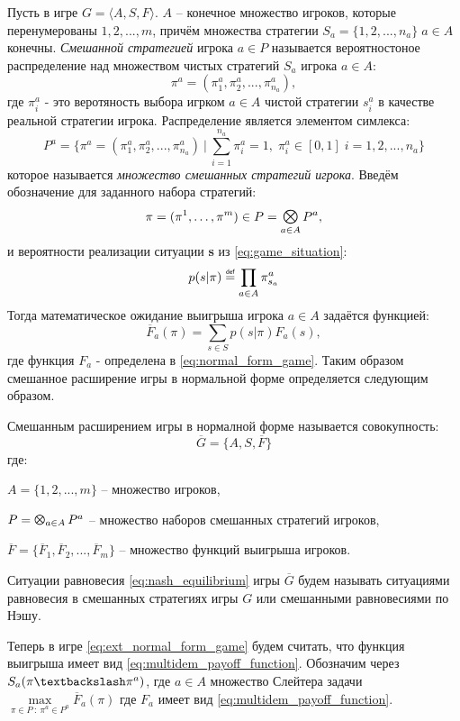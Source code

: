 Пусть в игре 
$G = \big \langle A, S, F \big \rangle$. $A$ -- конечное множество игроков,
которые перенумерованы $1, 2, ..., m$, причём
множества стратегии $S_a=\{1, 2,...,n_a\} \; a \in A$ конечны.  
\textit{Смешанной стратегией} игрока $a \in P$ называется 
вероятностоное распределение над множеством чистых стратегий 
$S_a$ игрока $a \in A$:
$$
	\pi^a=(\pi^a_1, \pi^a_2, ..., \pi^a_{n_a}),
$$
где $\pi^a_i$ - это веротяность выбора игрком $a \in A$ чистой 
стратегии $s^a_i$ в качестве реальной стратегии игрока.
Распределение является элементом симлекса:
$$
	P^a = \{ 
		\pi^a=(\pi^a_1, \pi^a_2, ..., \pi^a_{n_a}) \: | \:
		\sum \limits_{i=1}^{n_a} \pi^a_i = 1, \; \pi^a_i \in [0,1] \; 
		i = 1, 2, ..., n_a
		\}
$$
которое называется \textit{множество смешанных стратегий игрока}.
Введём обозначение для заданного набора стратегий:
$$
	\pi = (\pi^1, \ldots, \pi^m) \in P = \Motimes_{a \in A} P^a,
$$
и вероятности реализации ситуации \textbf{s} из 
\eqref{eq:game_situation}:
$$
	p(s|\pi) \myeq \prod_{a \in A} \pi^a_{s_a}
$$
Тогда математическое ожидание выигрыша игрока $a \in A$
задаётся функцией: 
$$
	\overline F_a(\pi) = \sum \limits_{s \in S}p(s|\pi)F_a(s),
$$
где функция $F_a$ - определена в \eqref{eq:normal_form_game}.
Таким образом смешанное расширение игры в нормальной форме определяется
следующим образом. 

\begin{Def}
	Смешанным расширением игры в нормалной форме называется 
	совокупность:
	\begin{equation}
		\overline G = \lbrace A, S, \overline F \rbrace	
		\label{eq:ext_normal_form_game}
	\end{equation}
	где: 
 
	$A = \{1, 2, ..., m\}$ -- множество игроков,

	$P = \Motimes_{a \in A} P^a$ -- множество наборов смешанных 
	стратегий игроков,

	$\overline F = \{
		\overline F_1, \overline F_2, ..., \overline F_m
	\}$
	-- множество функций выигрыша игроков.
\end{Def}

Ситуации равновесия \eqref{eq:nash_equilibrium} игры $\overline G$
будем называть ситуациями равновесия в смешанных стратегиях игры $G$
или смешанными равновесиями по Нэшу. 

Теперь в игре \eqref{eq:ext_normal_form_game} будем считать, что функция
выигрыша имеет вид \eqref{eq:multidem_payoff_function}.
Обозначим через $S_a(\pi \textbackslash \pi^a)$, где 
$a \in A$ множество Слейтера задачи 
$
	\max \limits_{\pi \in P \: : \: \pi^a \in P^a} \overline F_a(\pi) 
$
где $F_a$ имеет вид \eqref{eq:multidem_payoff_function}.

